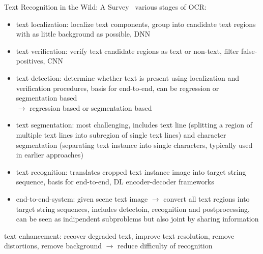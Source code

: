 Text Recognition in the Wild: A Survey~\citep{chen_text_2021}
various stages of \ac{OCR}:
\begin{itemize}
    \item text localization: localize text components, group into candidate text regions with
        as little background as possible, DNN
    \item text verification: verify text candidate regions as text or non-text,
        filter false-positives, CNN
    \item text detection: determine whether text is present using localization and verification
        procedures, basis for end-to-end, can be regression or segmentation based\\
        $\rightarrow$ regression based or segmentation based
    \item text segmentation: most challenging, includes text line (splitting a region of multiple
        text lines into subregion of single text lines) and character segmentation (separating
        text instance into single characters, typically used in earlier approaches)
    \item text recognition: translates cropped text instance image into target string sequence,
        basis for end-to-end, DL encoder-decoder frameworks
    \item end-to-end-system: given scene text image $\rightarrow$ convert all text regions into
        target string sequences, includes detectoin, recognition and postprocessing, can be
        seen as indipendent subproblems but also joint by sharing information
\end{itemize}

text enhancement: recover degraded text, improve text resolution, remove distortions,
remove background $\rightarrow$ reduce difficulty of recognition

